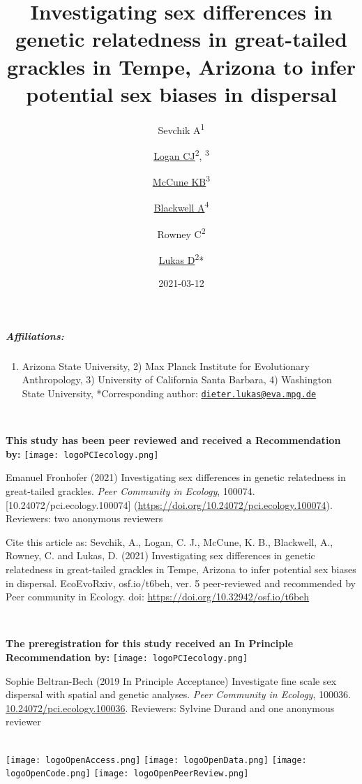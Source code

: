 \documentclass[
]{article}
\title{Investigating sex differences in genetic relatedness in
great-tailed grackles in Tempe, Arizona to infer potential sex biases in
dispersal}
\author{Sevchik
A\textsuperscript{1} \and \href{http://CorinaLogan.com}{Logan
CJ}\textsuperscript{2},
\textsuperscript{3} \and \href{https://www.kelseymccune.com}{McCune
KB}\textsuperscript{3} \and \href{https://blackwell-lab.com}{Blackwell
A}\textsuperscript{4} \and Rowney
C\textsuperscript{2} \and \href{http://dieterlukas.strikingly.com}{Lukas
D}\textsuperscript{2}*}
\date{2021-03-12}
\providecommand{\tightlist}{%
  \setlength{\itemsep}{0pt}\setlength{\parskip}{0pt}}
\begin{document}
\maketitle

\hypertarget{affiliations}{%
\subparagraph{Affiliations:}\label{affiliations}}

\begin{enumerate}
\def\labelenumi{\arabic{enumi})}
\tightlist
\item
  Arizona State University, 2) Max Planck Institute for Evolutionary
  Anthropology, 3) University of California Santa Barbara, 4) Washington
  State University, *Corresponding author:
  \href{mailto:dieter.lukas@eva.mpg.de}{\nolinkurl{dieter.lukas@eva.mpg.de}}
\end{enumerate}

~ ~

\textbf{This study has been peer reviewed and received a Recommendation
by:}
\texttt{[image: logoPCIecology.png]}

Emanuel Fronhofer (2021) Investigating sex differences in genetic
relatedness in great-tailed grackles. \emph{Peer Community in Ecology},
100074. {[}10.24072/pci.ecology.100074{]}
(\url{https://doi.org/10.24072/pci.ecology.100074}). Reviewers: two
anonymous reviewers

Cite this article as: Sevchik, A., Logan, C. J., McCune, K. B.,
Blackwell, A., Rowney, C. and Lukas, D. (2021) Investigating sex
differences in genetic relatedness in great-tailed grackles in Tempe,
Arizona to infer potential sex biases in dispersal. EcoEvoRxiv,
osf.io/t6beh, ver. 5 peer-reviewed and recommended by Peer community in
Ecology. doi: \url{https://doi.org/10.32942/osf.io/t6beh}

~ ~

\textbf{The preregistration for this study received an In Principle
Recommendation by:}
\texttt{[image: logoPCIecology.png]}

Sophie Beltran-Bech (2019 In Principle Acceptance) Investigate fine
scale sex dispersal with spatial and genetic analyses. \emph{Peer
Community in Ecology}, 100036.
\href{https://doi.org/10.24072/pci.ecology.100036}{10.24072/pci.ecology.100036}.
Reviewers: Sylvine Durand and one anonymous reviewer

~\\
\texttt{[image: logoOpenAccess.png]}
\texttt{[image: logoOpenData.png]}
\texttt{[image: logoOpenCode.png]}
\texttt{[image: logoOpenPeerReview.png]}

~\\
\hspace*{0.333em}
\end{document}
